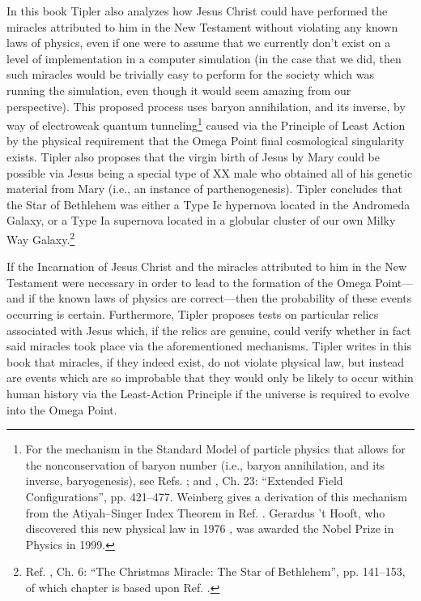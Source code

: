 \documentclass[letterpaper,12pt]{article}
\begin{document}
In this book Tipler also analyzes how Jesus Christ could have performed the \glspl{miracle} attributed to him in the New Testament without violating any known laws of physics, even if one were to assume that we currently don't exist on a level of implementation in a computer simulation (in the case that we did, then such miracles would be trivially easy to perform for the society which was running the simulation, even though it would seem amazing from our perspective). This proposed process uses baryon annihilation, and its inverse, by way of electroweak quantum tunneling\footnote{\label{foot:BaryonMechanism}For the mechanism in the Standard Model of particle physics that allows for the nonconservation of baryon number (i.e., baryon annihilation, and its inverse, baryogenesis), see Refs. ; and , Ch. 23: ``Extended Field Configurations'', pp. 421--477. Weinberg gives a derivation of this mechanism from the Atiyah--Singer Index Theorem in Ref. . Gerardus 't Hooft, who discovered this new physical law in 1976 \cite{Hooft1976}, was awarded the Nobel Prize in Physics in 1999.} caused via the Principle of Least Action by the physical requirement that the Omega Point final cosmological singularity exists. Tipler also proposes that the virgin birth of Jesus by Mary could be possible via Jesus being a special type of XX male who obtained all of his genetic material from Mary (i.e., an instance of parthenogenesis). Tipler concludes that the Star of Bethlehem was either a Type Ic hypernova located in the Andromeda Galaxy, or a Type Ia supernova located in a globular cluster of our own Milky Way Galaxy.\footnote{Ref. , Ch. 6: ``The Christmas Miracle: The Star of Bethlehem'', pp. 141--153, of which chapter is based upon Ref. .}

If the Incarnation of Jesus Christ and the miracles attributed to him in the New Testament were necessary in order to lead to the formation of the Omega Point---and if the known laws of physics are correct---then the probability of these events occurring is certain. Furthermore, Tipler proposes tests on particular relics associated with Jesus which, if the relics are genuine, could verify whether in fact said miracles took place via the aforementioned mechanisms. Tipler writes in this book that miracles, if they indeed exist, do not violate physical law, but instead are events which are so improbable that they would only be likely to occur within human history via the Least-Action Principle if the universe is required to evolve into the Omega Point.
\end{document}
